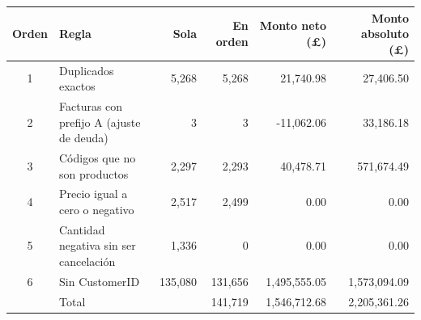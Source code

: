 \begin{tabular}{clrrrr}
\toprule
Orden & Regla & Sola & En orden & Monto neto (\pounds) & Monto absoluto (\pounds) \\
\midrule
1 & Duplicados exactos & 5,268 & 5,268 & 21,740.98 & 27,406.50 \\
2 & Facturas con prefijo A (ajuste de deuda) & 3 & 3 & -11,062.06 & 33,186.18 \\
3 & Códigos que no son productos & 2,297 & 2,293 & 40,478.71 & 571,674.49 \\
4 & Precio igual a cero o negativo & 2,517 & 2,499 & 0.00 & 0.00 \\
5 & Cantidad negativa sin ser cancelación & 1,336 & 0 & 0.00 & 0.00 \\
6 & Sin CustomerID & 135,080 & 131,656 & 1,495,555.05 & 1,573,094.09 \\
 & Total &  & 141,719 & 1,546,712.68 & 2,205,361.26 \\
\bottomrule
\end{tabular}
